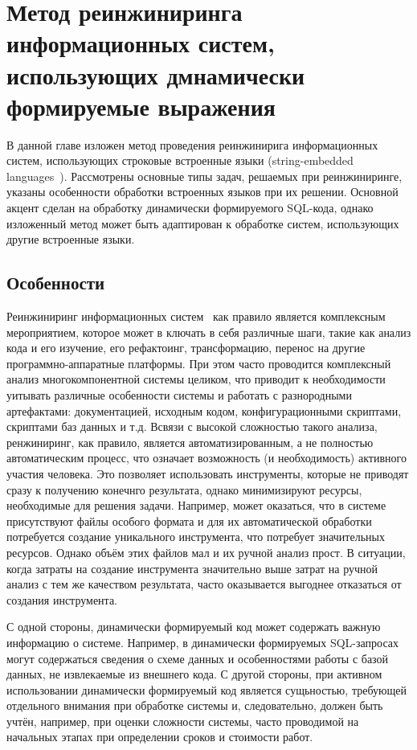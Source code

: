 \chapter{Метод реинжиниринга информационных систем, использующих дмнамически формируемые выражения}

В данной главе изложен метод проведения реинжинирига информационных систем, использующих строковые встроенные языки (string-embedded languages~\cite{Alvor1}). Рассмотрены основные типы задач, решаемых при реинжиниринге, указаны особенности обработки встроенных языков при их решении. Основной акцент сделан на обработку динамически формируемого SQL-кода, однако изложенный метод может быть адаптирован к обработке систем, использующих другие встроенные языки.

\section{Особенности}

Реинжиниринг информационных систем~\cite{reengANT} как правило является комплексным мероприятием, которое может в ключать в себя различные шаги, такие как анализ кода и его изучение, его рефактоинг, трансформацию, перенос на другие программно-аппаратные платформы. При этом часто проводится комплексный анализ многокомпонентной системы целиком, что приводит к необходимости уитывать различные особенности системы и работать с разнородными артефактами: документацией, исходным кодом, конфигурационными скриптами, скриптами баз данных и т.д. Всвязи с высокой сложностью такого анализа, ренжиниринг, как правило, является автоматизированным, а не полностью автоматическим процесс, что означает возможность (и необходимость) активного участия человека. Это позволяет использовать инструменты, которые не приводят сразу к получению конечнго результата, однако минимизируют ресурсы, необходимые для решения задачи. Например, может оказаться, что в системе присутствуют файлы особого формата и для их автоматической обработки потребуется создание уникального инструмента, что потребует значительных ресурсов. Однако объём этих файлов мал и их ручной анализ прост. В ситуации, когда затраты на создание инструмента значительно выше затрат на ручной анализ с тем же качеством результата, часто оказывается выгоднее отказаться от создания инструмента.

С одной стороны, динамически формируемый код может содержать важную информацию о системе. Например, в динамически формируемых SQL-запросах могут содержаться сведения о схеме данных и особенностями работы с базой данных, не извлекаемые из внешнего кода. С другой стороны, при активном использовании динамически формируемый код является сущьностью, требующей отдельного внимания при обработке системы и, следовательно, должен быть учтён, например, при оценки сложности системы, часто проводимой на начальных этапах при определении сроков и стоимости работ.

